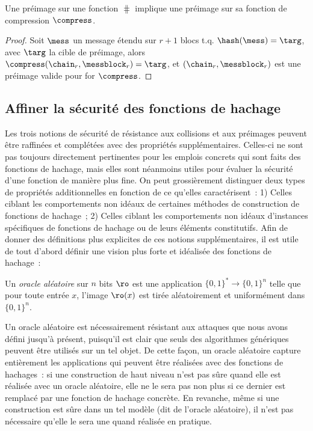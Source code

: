 \begin{prop}
Une préimage sur une fonction \merkdam $\hash$ implique une préimage sur sa fonction de compression
$\compress$.
\end{prop}
\begin{proof}
Soit 
$\mess$ un message étendu sur  $r+1$ blocs t.q. $\hash(\mess) = \targ$, avec $\targ$ la cible de préimage, alors
$\compress(\chain_r, \messblock_r) = \targ$, et $(\chain_r, \messblock_r)$ est une préimage valide pour for $\compress$.
\end{proof}

\subsection{Affiner la sécurité des fonctions de hachage\label{sec:frefmd}}

Les trois notions de sécurité de résistance aux collisions et aux préimages peuvent être raffinées et complétées avec des propriétés supplémentaires.
Celles-ci ne sont pas toujours directement pertinentes pour les emplois concrets qui sont faits des fonctions de hachage, mais elles sont néanmoins
utiles pour évaluer la sécurité d'une fonction de manière plus fine.
On peut grossièrement distinguer deux types de propriétés additionnelles en fonction de ce qu'elles caractérisent~: 1) Celles ciblant les comportements
non idéaux de certaines méthodes de construction de fonctions de hachage~; 2) Celles ciblant les comportements
non idéaux d'instances spécifiques de fonctions de hachage ou de leurs éléments constitutifs.
Afin de donner des définitions plus explicites de ces notions supplémentaires, il est utile de tout d'abord définir une vision plus forte et idéalisée des
fonctions de hachage~: 

\begin{fdefi}
Un \emph{oracle aléatoire} sur $n$ bits
$\ro$ est une application $\{0,1\}^* \rightarrow \{0,1\}^n$ telle que pour toute entrée $x$,
l'image $\ro(x)$ est tirée aléatoirement et uniformément dans $\{0,1\}^n$.
\end{fdefi}

Un oracle aléatoire est nécessairement résistant aux attaques que nous avons défini jusqu'à présent, puisqu'il est clair
que seuls des algorithmes génériques peuvent être utilisés sur un tel objet. De cette façon, un oracle aléatoire capture
entièrement les applications qui peuvent être réalisées avec des fonctions de hachages~: si une construction de haut niveau
n'est pas sûre quand elle est réalisée avec un oracle aléatoire, elle ne le sera pas non plus si ce dernier est remplacé par une fonction
de hachage concrète. En revanche, même si une construction est sûre dans un tel modèle (dit de l'oracle aléatoire), il n'est pas
nécessaire qu'elle le sera une quand réalisée en pratique.


